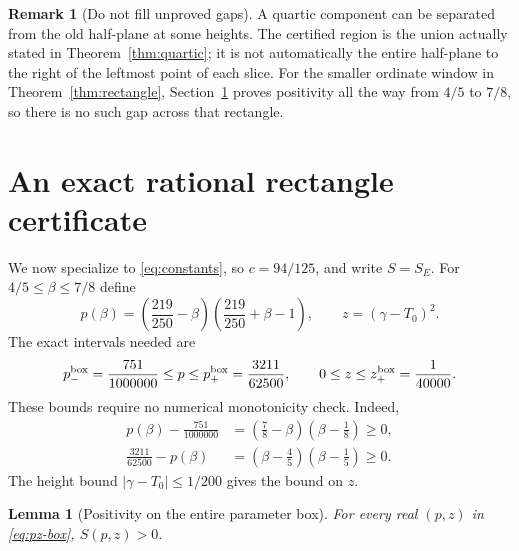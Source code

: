 \documentclass[11pt,a4paper]{article}
\newtheorem{lemma}[theorem]{Lemma}
\theoremstyle{definition}
\newtheorem{remark}[theorem]{Remark}
\newcommand{\Tcen}{T_0}
\begin{document}
\begin{remark}[Do not fill unproved gaps]\label{rem:gap}
A quartic component can be separated from the old half-plane at some
heights. The certified region is the union actually stated in
Theorem~\ref{thm:quartic}; it is not automatically the entire
half-plane to the right of the leftmost point of each slice.
For the smaller ordinate window in Theorem~\ref{thm:rectangle},
Section~\ref{sec:rational} proves positivity all the way from $4/5$
to $7/8$, so there is no such gap across that rectangle.
\end{remark}

\section{An exact rational rectangle certificate}
\label{sec:rational}

We now specialize to \eqref{eq:constants}, so $c=94/125$, and write
$S=S_E$. For $4/5\le\beta\le7/8$ define
\[
 p(\beta)=\left(\frac{219}{250}-\beta\right)
          \left(\frac{219}{250}+\beta-1\right),\qquad
 z=(\gamma-\Tcen)^2.
\]
The exact intervals needed are
\begin{equation}\label{eq:pz-box}
 p_-^{\rm box}=\frac{751}{1000000}\le p\le
 p_+^{\rm box}=\frac{3211}{62500},\qquad
 0\le z\le z_+^{\rm box}=\frac1{40000}.
\end{equation}
These bounds require no numerical monotonicity check. Indeed,
\begin{align*}
 p(\beta)-\frac{751}{1000000}
   &=\left(\frac78-\beta\right)\left(\beta-\frac18\right)\ge0,\\
 \frac{3211}{62500}-p(\beta)
   &=\left(\beta-\frac45\right)\left(\beta-\frac15\right)\ge0.
\end{align*}
The height bound $|\gamma-\Tcen|\le1/200$ gives the bound on $z$.

\begin{lemma}[Positivity on the entire parameter box]\label{lem:box}
For every real $(p,z)$ in \eqref{eq:pz-box}, $S(p,z)>0$.
\end{lemma}
\end{document}
